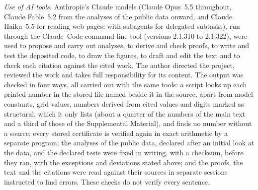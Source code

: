 \documentclass[aps,prx,twocolumn,10pt,superscriptaddress,nofootinbib,longbibliography,floatfix]{revtex4-2}
\theoremstyle{remark}
\begin{document}
\emph{Use of AI tools.} Anthropic's Claude models (Claude Opus~5.5 throughout, Claude Fable~5.2 from the analyses of %
the public data onward, and Claude Haiku~5.5 for reading web pages; with subagents for delegated subtasks), run %
through the Claude~Code command-line tool (versions 2.1.310 to 2.1.322), were used to propose and carry out %
analyses, to derive and check proofs, to write and test the deposited code, to draw the figures, to draft and edit
the text and to check each citation against the cited work. The author directed the project, reviewed the work and
takes full responsibility for its content. The output was checked in four ways, all carried out with the same tools:
a script looks up each printed number in the stored file named beside it in the source, apart from model constants,
grid values, numbers derived from cited values and digits marked as structural, which it only lists (about a quarter
of the numbers of the main text and a third of those of the Supplemental Material), and finds no number without a
source; every stored certificate is verified again in exact arithmetic by a separate program; the analyses of the
public data, declared after an initial look at the data, and the declared tests were fixed in writing, with a
checksum, before they ran, with the exceptions and deviations stated above; and the proofs, the text and the
citations were read against their sources in separate sessions instructed to find errors. These checks do not verify
every sentence.
\end{document}
